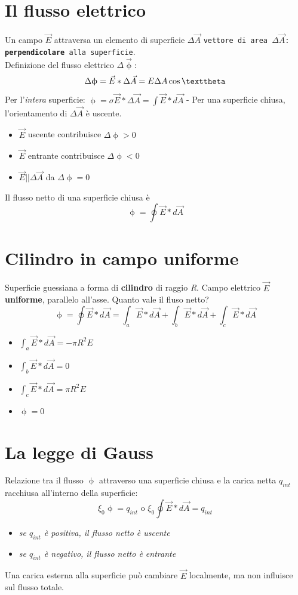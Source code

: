 \documentclass{book}
\begin{document}
\section {Il flusso elettrico}
Un campo $\vec{E}$ attraversa un elemento di superficie $\Delta \vec{A}$ \texttt{vettore di area $\Delta \vec{A}$: \textbf{perpendicolare} alla superficie}.\\ Definizione del flusso elettrico $\Delta \vec{\upphi}$:
\begin{equation}
	\Delta \upphi =\vec{E}*\Delta\vec{A}=E\Delta A\cos\texttheta
\end{equation}
Per l'\textit{intera} superficie:
$\upphi = \sigma \vec{E}*\Delta \vec{A}=\int \vec{E}*d\vec{A}$ - Per una superficie chiusa, l'orientamento di $\Delta \vec{A}$ è uscente.
\begin{itemize}
\item $\vec{E}$ uscente contribuisce $\Delta \upphi >0$
\item $\vec{E}$ entrante contribuisce $\Delta \upphi <0$
\item $\vec{E} || \Delta \vec{A}$ da $\Delta \upphi =0$
\end{itemize}
Il flusso netto di una superficie chiusa è
\begin{equation}
	\upphi=\oint \vec{E}*d\vec{A}
\end{equation}
\section{Cilindro in campo uniforme}
Superficie guessiana a forma di \textbf{cilindro} di raggio \textit{R}. Campo elettrico $\vec{E}$
\textbf{uniforme}, parallelo all'asse. Quanto vale il fluso netto?
\begin{equation}
  \upphi=\oint \vec{E}*d\vec{A}=\int_a \vec{E}*d\vec{A}+\int_b\vec{E}*d\vec{A}+\int_c \vec{E}*
  d\vec{A}
\end{equation}
\begin{itemize}
\item $\int_a \vec{E}*d\vec{A}=-\pi R^2E$
\item $\int_b \vec{E}*d\vec{A}=0$
\item $\int_c\vec{E}*d\vec{A}=\pi R^2E$
\item $\upphi =0$  
\end{itemize}
\section{La legge di Gauss}
Relazione tra il flusso $\upphi$ attraverso una superficie chiusa e la carica netta $q_{int}$ racchiusa all'interno della superficie:
\begin{equation}
	\xi_0\upphi=q_{int} \text{ o } \xi_0\oint \vec{E}*d\vec{A}=q_{int}
\end{equation}
\begin{itemize}
\item \textit{se $q_{int}$ è positiva, il flusso netto è uscente}
\item \textit{se $q_{int}$ è negativo, il flusso netto è entrante}
\end{itemize}
Una carica esterna alla superficie può cambiare $\vec{E}$ localmente, ma non influisce sul flusso totale.
\end{document}
